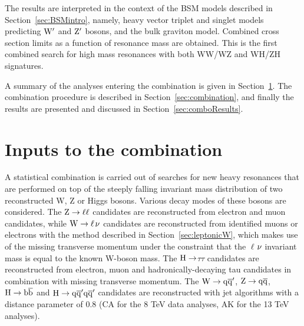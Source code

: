The results are interpreted in the context of the BSM models described in Section~\ref{sec:BSMintro}, namely, heavy vector triplet and singlet models predicting $\mathrm{W}^\prime$ and $\mathrm{Z}^\prime$ bosons, and the bulk graviton model.
Combined cross section limits as a function of resonance mass are obtained. This is the first combined search for high mass resonances with both WW/WZ and WH/ZH signatures.

A summary of the analyses entering the combination is given in Section~\ref{sec:analyses}.
The combination procedure is described in Section~\ref{sec:combination}, and finally the results are presented and discussed in Section~\ref{sec:comboResults}.

\section{Inputs to the combination}\label{sec:analyses}

A statistical combination is carried out of searches for new heavy resonances that are performed on top of the steeply falling invariant mass distribution of two reconstructed W, Z or Higgs bosons. Various decay modes of these bosons are considered.
The $\rm Z\to \ell\ell$ candidates are reconstructed from electron and muon candidates, while $\rm W \to \ell$$\nu$ candidates are reconstructed from identified muons or electrons with the method described in Section~\ref{sec:leptonicW}, which makes use 
of the missing transverse momentum under the constraint that the $\ell$$\nu$ invariant mass is equal to the known W-boson mass.
The $\rm H\to$$\tau\tau$ candidates are reconstructed from electron, muon and hadronically-decaying tau candidates in combination with missing transverse momentum.
The $\rm W\to \mathrm{q}\overline{\mathrm{q}}'$, $\rm Z\to \mathrm{q}\overline{\mathrm{q}}$, $\rm H\to {\mathrm{b}\overline{\mathrm{b}}}$ and $\rm H\to \mathrm{q}\overline{\mathrm{q}}'\mathrm{q}\overline{\mathrm{q}}'$ candidates are reconstructed with jet algorithms with a distance parameter of 0.8 (CA for the 8 TeV data analyses, AK for the 13 TeV analyses). 

